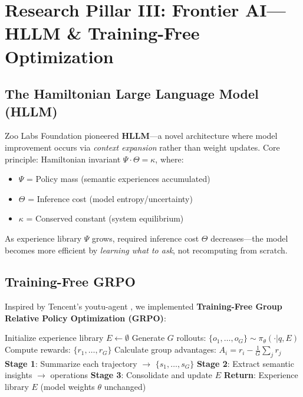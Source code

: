 \section{Research Pillar III: Frontier AI—HLLM \& Training-Free Optimization}


\subsection{The Hamiltonian Large Language Model (HLLM)}

Zoo Labs Foundation pioneered \textbf{HLLM}—a novel architecture where model improvement occurs via \textit{context expansion} rather than weight updates. Core principle: Hamiltonian invariant $\Psi \cdot \Theta = \kappa$, where:

\begin{itemize}
    \item $\Psi$ = Policy mass (semantic experiences accumulated)
    \item $\Theta$ = Inference cost (model entropy/uncertainty)
    \item $\kappa$ = Conserved constant (system equilibrium)
\end{itemize}

As experience library $\Psi$ grows, required inference cost $\Theta$ decreases—the model becomes more efficient by \textit{learning what to ask}, not recomputing from scratch.

\subsection{Training-Free GRPO}

Inspired by Tencent's youtu-agent \citep{youtu2024trainingfree}, we implemented \textbf{Training-Free Group Relative Policy Optimization (GRPO)}:

\begin{algorithm}[h]
\caption{Training-Free GRPO}
\begin{algorithmic}
\STATE Initialize experience library $E \leftarrow \emptyset$
        \STATE Generate $G$ rollouts: $\{o_1, \ldots, o_G\} \sim \pi_\theta(\cdot|q, E)$
        \STATE Compute rewards: $\{r_1, \ldots, r_G\}$
        \STATE Calculate group advantages: $A_i = r_i - \frac{1}{G}\sum_j r_j$
            \STATE \textbf{Stage 1}: Summarize each trajectory $\rightarrow$ $\{s_1, \ldots, s_G\}$
            \STATE \textbf{Stage 2}: Extract semantic insights $\rightarrow$ operations
            \STATE \textbf{Stage 3}: Consolidate and update $E$
        \ENDIF
    \ENDFOR
\ENDFOR
\STATE \textbf{Return}: Experience library $E$ (model weights $\theta$ unchanged)
\end{algorithmic}
\end{algorithm}

